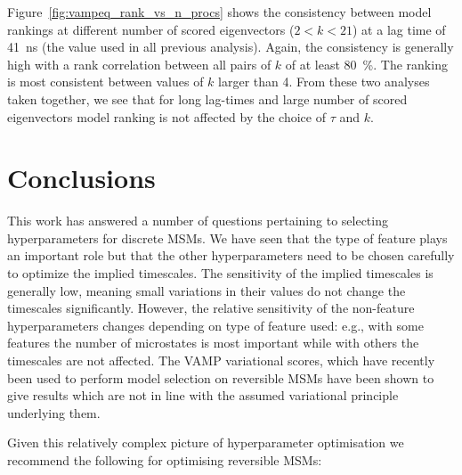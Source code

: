 \documentclass[journal=jacsat,manuscript=article]{achemso}
\begin{document}
Figure~\ref{fig:vampeq_rank_vs_n_procs} shows the consistency between model rankings at different number of scored eigenvectors ($2 < k < 21$) at a lag time of \SI{41}{\nano\second} (the value used in all previous analysis). Again, the consistency is generally high with a rank correlation between all pairs of $k$ of at least \SI{80}{\percent}. The ranking is most consistent between values of $k$ larger than \num{4}.  From these two analyses taken together, we see that for long lag-times and large number of scored eigenvectors model ranking is not affected by the choice of $\tau$ and $k$.

\section{Conclusions}
This work has answered a number of questions pertaining to selecting hyperparameters for discrete MSMs.  We have seen that the type of feature plays an important role but that the other hyperparameters need to be chosen carefully to optimize the implied timescales.  The sensitivity of the implied timescales is generally low, meaning small variations in their values do not change the timescales significantly.  However, the relative sensitivity of the non-feature hyperparameters changes depending on type of feature used: e.g., with some features the number of microstates is most important while with others the timescales are not affected.  The VAMP variational scores, which have recently been used to perform model selection on reversible MSMs have been shown to give results which are not in line with the assumed variational principle underlying them. 

Given this relatively complex picture of hyperparameter optimisation we recommend the following for optimising reversible MSMs: 
\end{document}
